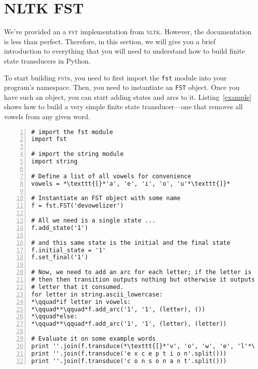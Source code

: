 \documentclass[11pt]{article}
\begin{document}
\section*{NLTK FST}

We've provided an a \textsc{fst} implementation from \textsc{nltk}.
However, the documentation is less than perfect. Therefore, in this
section, we will give you a brief introduction to everything that you
will need to understand how to build finite state transducers in Python.

To start building \textsc{fst}s, you need to first import the
\texttt{fst} module into your program's namespace. Then, you need to
instantiate an \texttt{FST} object. Once you have such an object, you
can start adding states and arcs to it. Listing~\ref{example} shows
how to build a very simple finite state transducer---one that removes
all vowels from any given word.

\begin{lstlisting}[float, label=example,caption=A 1-state transducer that deletes vowels, frame=trBL,escapechar=*, numbers=left, numberstyle=\tiny, numberblanklines=false]
# import the fst module
import fst

# import the string module
import string

# Define a list of all vowels for convenience
vowels = *\texttt{[}*'a', 'e', 'i', 'o', 'u'*\texttt{]}*

# Instantiate an FST object with some name
f = fst.FST('devowelizer')

# All we need is a single state ...
f.add_state('1')

# and this same state is the initial and the final state
f.initial_state = '1'
f.set_final('1')

# Now, we need to add an arc for each letter; if the letter is a vowel
# then then transition outputs nothing but otherwise it outputs the same
# letter that it consumed.
for letter in string.ascii_lowercase:
*\qquad*if letter in vowels:
*\qquad**\qquad*f.add_arc('1', '1', (letter), ())
*\qquad*else:
*\qquad**\qquad*f.add_arc('1', '1', (letter), (letter))

# Evaluate it on some example words
print ''.join(f.transduce(*\texttt{[}*'v', 'o', 'w', 'e', 'l'*\texttt{]}*))
print ''.join(f.transduce('e x c e p t i o n'.split()))
print ''.join(f.transduce('c o n s o n a n t'.split()))

\end{lstlisting}
\end{document}
